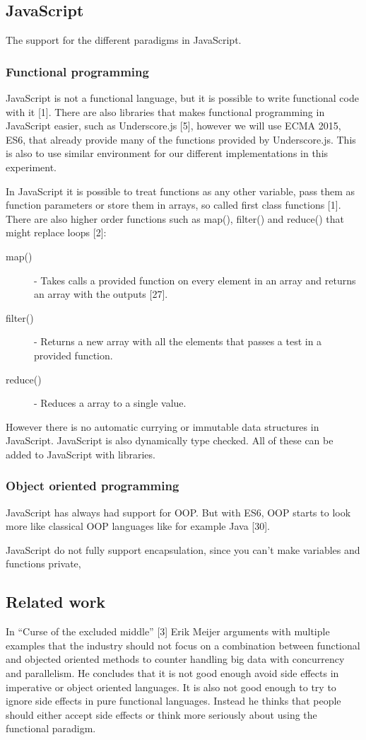 \documentclass {article}
\begin{document}
\subsection{JavaScript}
The support for the different paradigms in JavaScript.
\subsubsection{Functional programming}
JavaScript is not a functional language, but it is possible to write functional code with it [1]. There are also libraries that makes functional programming in JavaScript easier, such as Underscore.js [5], however we will use ECMA 2015, ES6, that already provide many of the functions provided by Underscore.js. This is also to use similar environment for our different implementations in this experiment.

In JavaScript it is possible to treat functions as any other variable, pass them as function parameters or store them in arrays, so called first class functions [1]. There are also higher order functions such as map(), filter() and reduce() that might replace loops [2]:

\begin{description}
\item [map()] - Takes calls a provided function on every element in an array and returns an array with the outputs [27].
\item [filter()] - Returns a new array with all the elements that passes a test in a provided function. 
\item [reduce()] - Reduces a array to a single value.
\end{description}

However there is no automatic currying or immutable data structures in JavaScript. JavaScript is also dynamically type checked. All of these can be added to JavaScript with libraries.
\subsubsection{Object oriented programming}
JavaScript has always had support for OOP. But 
with ES6, OOP starts to look more like classical OOP languages like for example Java [30].

JavaScript do not fully support encapsulation, since you can’t make variables and functions private,
\subsection{Related work}
In “Curse of the excluded middle” [3] Erik Meijer arguments with multiple examples that the industry should not focus on a combination between functional and objected oriented methods to counter handling big data with concurrency and parallelism. He concludes that it is not good enough avoid side effects in imperative or object oriented languages. It is also not good enough to try to ignore side effects in pure functional languages. Instead he thinks that people should either accept side effects or think more seriously about using the functional paradigm.
\end{document}
